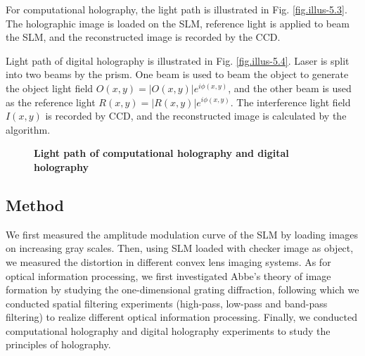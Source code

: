 \documentclass[10pt,a4paper,twocolumn,twoside,UTF8]{article}
\begin{document}
		For computational holography, the light path is illustrated in Fig. \ref{fig.illus-5.3}. 
		The holographic image is loaded on the SLM, reference light is applied to beam the SLM, and the reconstructed image is recorded by the CCD. 

		Light path of digital holography is illustrated in Fig. \ref{fig.illus-5.4}. Laser is split into two beams by the prism. 
		One beam is used to beam the object to generate the object light field $O(x,y) = |O(x,y)|e^{i\phi(x,y)}$, and the other beam is used as the reference light $R(x,y) = |R(x,y)|e^{i\phi(x,y)}$. 
		The interference light field $I(x, y)$ is recorded by CCD, and the reconstructed image is calculated by the algorithm.

		\begin{figure}[htbp]
			\centering		
			\caption{\textbf{Light path of computational holography and digital holography}}
		\end{figure}

	\subsection{Method}
	We first measured the amplitude modulation curve of the SLM by loading images on increasing gray scales.
	Then, using SLM loaded with checker image as object, we measured the distortion in different convex lens imaging systems.
	As for optical information processing, we first investigated Abbe's theory of image formation by studying the one-dimensional grating diffraction, 
	following which we conducted spatial filtering experiments (high-pass, low-pass and band-pass filtering) to realize different optical information processing.
	Finally, we conducted computational holography and digital holography experiments to study the principles of holography.
\end{document}
